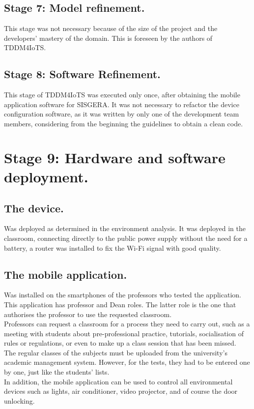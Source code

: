 \documentclass[]{scrartcl}
\begin{document}
	\subsection*{Stage 7: Model refinement.}
	This stage was not necessary because of the size of the project and the developers' mastery of the domain. This is foreseen by the authors of TDDM4IoTS.\\
	\subsection*{Stage 8: Software Refinement.}
	This stage of TDDM4IoTS was executed only once, after obtaining the mobile application software for SISGERA. It was not necessary to refactor the device configuration software, as it was written by only one of the development team members, considering from the beginning the guidelines to obtain a clean code.
\section*{Stage 9: Hardware and software deployment.}
	\subsection*{The device.}
	Was deployed as determined in the environment analysis. It was deployed in the classroom, connecting directly to the public power supply without the need for a battery, a router was installed to fix the Wi-Fi signal with good quality.\\
	\subsection*{The mobile application.}
	Was installed on the smartphones of the professors who tested the application. This application has professor and Dean roles. The latter role is the one that authorises the professor to use the requested classroom.\\
	Professors can request a classroom for a process they need to carry out, such as a meeting with students about pre-professional practice, tutorials, socialisation of rules or regulations, or even to make up a class session that has been missed.\\
	The regular classes of the subjects must be uploaded from the university's academic management system. However, for the tests, they had to be entered one by one, just like the students' lists.\\
	In addition, the mobile application can be used to control all environmental devices such as lights, air conditioner, video projector, and of course the door unlocking.
\end{document}
